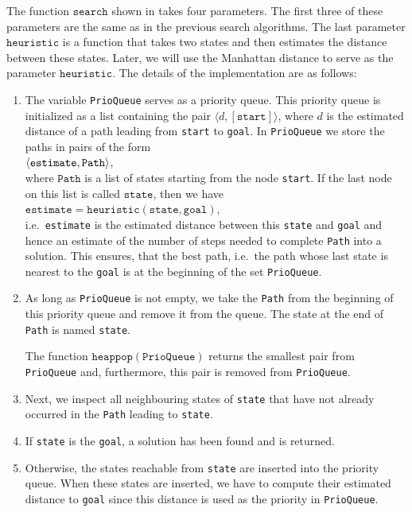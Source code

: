 The function $\texttt{search}$ shown in  takes four parameters.  The
first three of these parameters are the same as in the previous search algorithms.  The last parameter
$\texttt{heuristic}$ is a function that takes two states and then estimates the distance between these states.
Later, we will use the Manhattan distance to serve as the parameter $\texttt{heuristic}$.  The details of the
implementation are as follows:
\begin{enumerate}
\item The variable \texttt{PrioQueue} serves as a priority queue.  This priority queue is initialized as a
      list containing the pair $\langle d, [\mathtt{start}] \rangle$, where $d$ is the estimated distance of a path
      leading from \texttt{start} to \texttt{goal}.  In \texttt{PrioQueue} we store the paths 
      in pairs of the form
      \\[0.2cm]
      \hspace*{1.3cm}
      $\pair(\mathtt{estimate}, \mathtt{Path})$,
      \\[0.2cm]
      where $\texttt{Path}$ is a list of states starting from the node \texttt{start}.  If the last node on
      this list is called $\texttt{state}$, then we have
      \\[0.2cm]
      \hspace*{1.3cm}
      $\mathtt{estimate} = \mathtt{heuristic}(\mathtt{state}, \mathtt{goal})$,
      \\[0.2cm] 
      i.e.~\texttt{estimate} is the estimated distance between this \texttt{state} and \texttt{goal} and hence
      an estimate of the number of steps needed to complete \texttt{Path} into a solution.  This ensures,
      that the best path, i.e.~the path whose last state is nearest to the \texttt{goal} is at the
      beginning of the set \texttt{PrioQueue}.
\item As long as \texttt{PrioQueue} is not empty, we take the \texttt{Path} from the beginning of this
      priority queue and remove it from the queue.  The state at the end of \texttt{Path} is named \texttt{state}.

      The function $\texttt{heappop}(\mathtt{PrioQueue})$ returns the smallest pair from 
      \texttt{PrioQueue} and, furthermore, this pair is removed from \texttt{PrioQueue}.
\item Next, we inspect all neighbouring states of \texttt{state} that have not already occurred in the
      \texttt{Path} leading to \texttt{state}.

\item If \texttt{state} is the \texttt{goal}, a solution has been found and is returned.  
\item Otherwise, the states reachable from \texttt{state} are inserted into the priority queue.
      When these states are inserted, we have to compute their estimated distance to \texttt{goal} since this
      distance is used as the priority in \texttt{PrioQueue}.
\end{enumerate}
